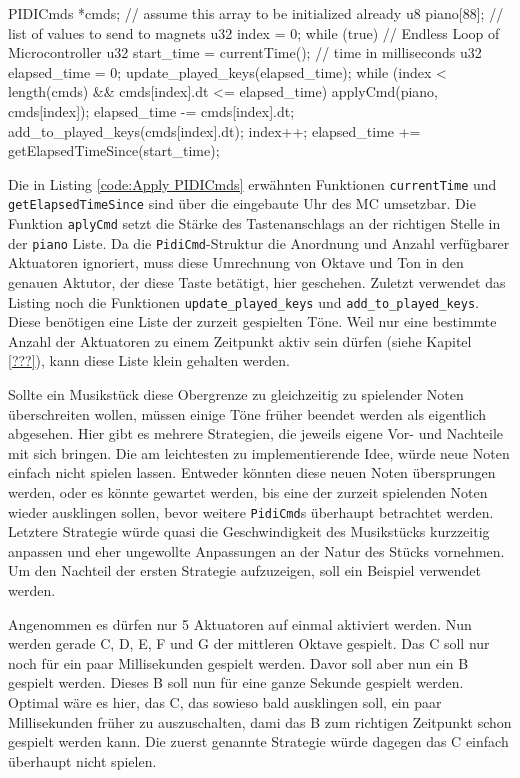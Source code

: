 \begin{UnbrokenCodePage}[style=CStyle, caption={Nutzung der \lstinline{PidiCmd}-Struktur}, label={code:Apply PIDICmds}]
PIDICmds *cmds; // assume this array to be initialized already
u8  piano[88];  // list of values to send to magnets
u32 index = 0;
while (true) {  // Endless Loop of Microcontroller
    u32 start_time   = currentTime(); // time in milliseconds
    u32 elapsed_time = 0;
    update_played_keys(elapsed_time);
    while (index < length(cmds) && cmds[index].dt <= elapsed_time) {
        applyCmd(piano, cmds[index]);
        elapsed_time -= cmds[index].dt;
        add_to_played_keys(cmds[index].dt);
        index++;
    }
    elapsed_time += getElapsedTimeSince(start_time);
}
\end{UnbrokenCodePage}

Die in Listing \ref{code:Apply PIDICmds} erwähnten Funktionen \lstinline{currentTime} und \lstinline{getElapsedTimeSince} sind über die eingebaute Uhr des \ac{MC} umsetzbar.
Die Funktion \lstinline{aplyCmd} setzt die Stärke des Tastenanschlags an der richtigen Stelle in der \lstinline{piano} Liste.
Da die \lstinline{PidiCmd}-Struktur die Anordnung und Anzahl verfügbarer Aktuatoren ignoriert, muss diese Umrechnung von Oktave und Ton in den genauen Aktutor, der diese Taste betätigt, hier geschehen.
Zuletzt verwendet das Listing noch die Funktionen \lstinline{update_played_keys} und \lstinline{add_to_played_keys}.
Diese benötigen eine Liste der zurzeit gespielten Töne.
Weil nur eine bestimmte Anzahl der Aktuatoren zu einem Zeitpunkt aktiv sein dürfen (siehe Kapitel \ref{???}), kann diese Liste klein gehalten werden.

Sollte ein Musikstück diese Obergrenze zu gleichzeitig zu spielender Noten überschreiten wollen, müssen einige Töne früher beendet werden als eigentlich abgesehen.
Hier gibt es mehrere Strategien, die jeweils eigene Vor- und Nachteile mit sich bringen.
Die am leichtesten zu implementierende Idee, würde neue Noten einfach nicht spielen lassen.
Entweder könnten diese neuen Noten übersprungen werden, oder es könnte gewartet werden, bis eine der zurzeit spielenden Noten wieder ausklingen sollen, bevor weitere \lstinline{PidiCmd}s überhaupt betrachtet werden.
Letztere Strategie würde quasi die Geschwindigkeit des Musikstücks kurzzeitig anpassen und eher ungewollte Anpassungen an der Natur des Stücks vornehmen.
Um den Nachteil der ersten Strategie aufzuzeigen, soll ein Beispiel verwendet werden.

Angenommen es dürfen nur 5 Aktuatoren auf einmal aktiviert werden.
Nun werden gerade C, D, E, F und G der mittleren Oktave gespielt.
Das C soll nur noch für ein paar Millisekunden gespielt werden.
Davor soll aber nun ein B gespielt werden.
Dieses B soll nun für eine ganze Sekunde gespielt werden.
Optimal wäre es hier, das C, das sowieso bald ausklingen soll, ein paar Millisekunden früher zu auszuschalten, dami das B zum richtigen Zeitpunkt schon gespielt werden kann.
Die zuerst genannte Strategie würde dagegen das C einfach überhaupt nicht spielen.

